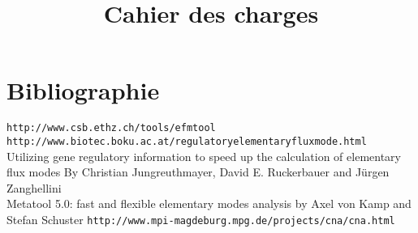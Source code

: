 \documentclass[12pt,a4paper]{report}
\title{Cahier des charges}
\begin{document}


\tableofcontents

\thispagestyle{empty}











\chapter*{Bibliographie}

\texttt{http://www.csb.ethz.ch/tools/efmtool}\\
\texttt{http://www.biotec.boku.ac.at/regulatoryelementaryfluxmode.html}\\
Utilizing gene regulatory information to speed up the calculation of elementary flux modes By Christian Jungreuthmayer, David E. Ruckerbauer and Jürgen Zanghellini\\
Metatool 5.0: fast and flexible elementary modes analysis by Axel von Kamp and Stefan Schuster
\texttt{http://www.mpi-magdeburg.mpg.de/projects/cna/cna.html}

\end{document}
